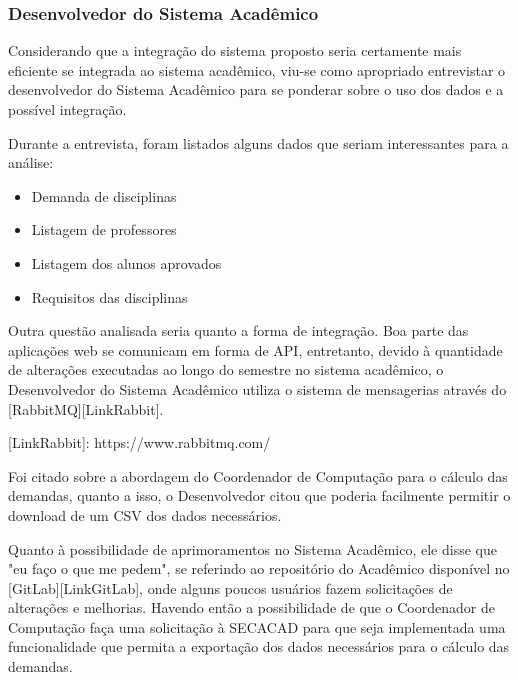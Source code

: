     \subsubsection{Desenvolvedor do Sistema Acadêmico} %

        Considerando que a integração do sistema proposto seria certamente mais eficiente se integrada ao sistema acadêmico, viu-se como apropriado entrevistar o desenvolvedor do Sistema Acadêmico para se ponderar sobre o uso dos dados e a possível integração.

        Durante a entrevista, foram listados alguns dados que seriam interessantes para a análise:

        \begin{itemize}
            \item Demanda de disciplinas
            \item Listagem de professores
            \item Listagem dos alunos aprovados
            \item Requisitos das disciplinas
        \end{itemize}


        Outra questão analisada seria quanto a forma de integração. Boa parte das aplicações web se comunicam em forma de API, entretanto, devido à quantidade de alterações executadas ao longo do semestre no sistema acadêmico, o Desenvolvedor do Sistema Acadêmico utiliza o sistema de mensagerias através do [RabbitMQ][LinkRabbit].

        [LinkRabbit]: https://www.rabbitmq.com/

        Foi citado sobre a abordagem do Coordenador de Computação para o cálculo das demandas, quanto a isso, o Desenvolvedor citou que poderia facilmente permitir o download de um CSV dos dados necessários.

        Quanto à possibilidade de aprimoramentos no Sistema Acadêmico, ele disse que "eu faço o que me pedem", se referindo ao repositório do Acadêmico disponível no [GitLab][LinkGitLab], onde alguns poucos usuários fazem solicitações de alterações e melhorias. Havendo então a possibilidade de que o Coordenador de Computação faça uma solicitação à SECACAD para que seja implementada uma funcionalidade que permita a exportação dos dados necessários para o cálculo das demandas.

